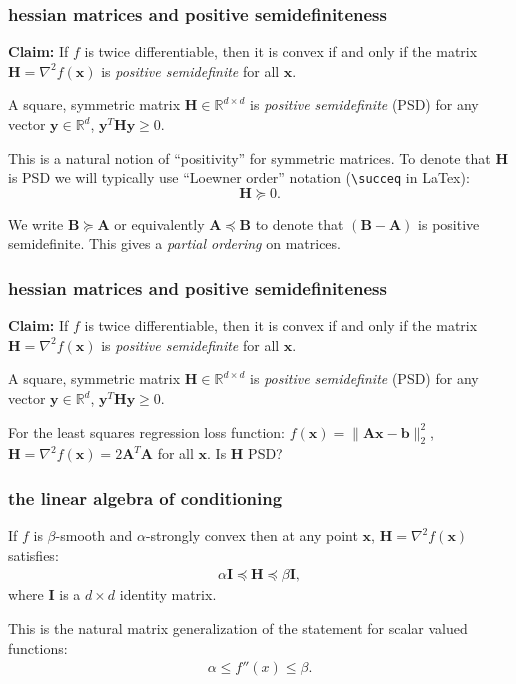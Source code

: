 \documentclass[compress]{beamer}
\newcommand{\bv}[1]{\mathbf{#1}}
\newcommand{\R}{\mathbb{R}}
\begin{document}
\begin{frame}[t]
	\frametitle{hessian matrices and positive semidefiniteness}
	\textbf{Claim:} If $f$ is twice differentiable, then it is convex if and only if the matrix $\bv{H} = \nabla^2 f(\bv{x})$ is \emph{positive semidefinite} for all $\bv{x}$. 
	
	\begin{definition}
		A square, symmetric matrix $\bv{H}\in \R^{d\times d}$ is \emph{positive semidefinite} (PSD) for any vector $\bv{y}\in \R^d$, $\bv{y}^T\bv{H}\bv{y} \geq 0$. 
	\end{definition}
	
	This is a natural notion of ``positivity'' for symmetric matrices. To denote that $\bv{H}$ is PSD we will typically use ``Loewner order'' notation (\texttt{\textbackslash succeq} in LaTex): $$\bv{H}\succeq 0.$$
	
	We write $\bv{B}\succeq \bv{A}$ or equivalently  $\bv{A}\preceq \bv{B}$ to denote that $(\bv{B} - \bv{A})$ is positive semidefinite. This gives a \emph{partial ordering} on matrices.
\end{frame}

\begin{frame}[t]
	\frametitle{hessian matrices and positive semidefiniteness}
	\textbf{Claim:} If $f$ is twice differentiable, then it is convex if and only if the matrix $\bv{H} = \nabla^2 f(\bv{x})$ is \emph{positive semidefinite} for all $\bv{x}$. 
	
	\begin{definition}
		A square, symmetric matrix $\bv{H}\in \R^{d\times d}$ is \emph{positive semidefinite} (PSD) for any vector $\bv{y}\in \R^d$, $\bv{y}^T\bv{H}\bv{y} \geq 0$. 
	\end{definition}
	
	For the least squares regression loss function: $f(\bv{x}) = \|\bv{A}\bv{x} - \bv{b}\|_2^2$, $\bv{H} = \nabla^2 f(\bv{x})= 2\bv{A}^T\bv{A}$ for all $\bv{x}$. Is $\bv{H}$ PSD?
\end{frame}

\begin{frame}[t]
	\frametitle{the linear algebra of conditioning}
	If $f$ is $\beta$-smooth and $\alpha$-strongly convex then at any point $\bv{x}$, $\bv{H} = \nabla^2 f(\bv{x})$ satisfies: 
	\begin{align*}
		\alpha\bv{I}\preceq \bv{H} \preceq \beta\bv{I},
	\end{align*}
	where $\bv{I}$ is a $d\times d$ identity matrix. 
	
	This is the natural matrix generalization of the statement for scalar valued functions:
	\begin{align*}
		\alpha \leq f''(x)\leq \beta.
	\end{align*}
	
\end{frame}
\end{document}
